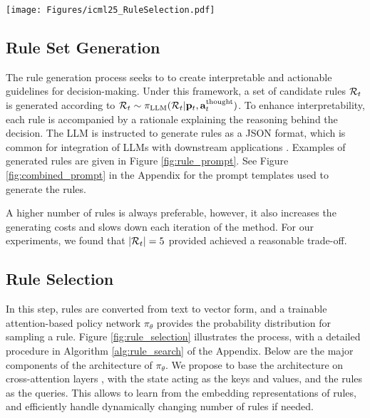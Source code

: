\begin{figure*}
    \centering
    \texttt{[image: Figures/icml25\_RuleSelection.pdf]}
    \caption{Overview of the \textsc{Rule Selection} step. The current state is encoded as a key vector, while candidate rules are encoded as Queries using a text embedding API (e.b., BERT sentence embedding). An attention-based policy network $\pi_\theta$ trained with SAC computes a probability distribution over the candidate rules, enabling the selection of the most suitable rule for decision-making and explanation.}
    \label{fig:rule_selection}
\end{figure*}

\subsection{Rule Set Generation}
\label{sec:rulegen}

The rule generation process seeks to to create interpretable and actionable guidelines for decision-making.
Under this framework, a set of candidate rules ${\mathcal{R}}_t$ is generated according to ${\mathcal{R}}_t\sim \pi_{\textrm{LLM}}({\mathcal{R}}_t|{\mathbf{p}}_t, {\mathbf{a}}^{\text{thought}}_t)$. To enhance interpretability, each rule is accompanied by a rationale explaining the reasoning behind the decision.  The LLM is instructed to generate rules as a JSON format, which is common for integration of LLMs with downstream applications \cite{together2024function}. Examples of generated rules are given in Figure \ref{fig:rule_prompt}. See Figure \ref{fig:combined_prompt} in the Appendix for the prompt templates used to generate the rules.


 A higher number of rules is always preferable, however, it also increases the generating costs and slows down each iteration of the method. For our experiments, we found that $|{\mathcal{R}}_t|=5$ provided achieved a reasonable trade-off.







\subsection{Rule Selection}\label{sec:ruleselection}

In this step, rules are converted from text to vector form, and a trainable attention-based policy network $\pi_{\theta}$ provides the probability distribution for sampling a rule. Figure \ref{fig:rule_selection} illustrates the process, with a detailed procedure in Algorithm \ref{alg:rule_search} of the Appendix. Below are the major components of the architecture of $\pi_\theta$. We propose to base the architecture on cross-attention layers \cite{bahdanau2014neural, vaswani2017attention}, with the state acting as the keys and values, and the rules as the queries. This allows to learn from the embedding representations of rules, and efficiently handle dynamically changing number of rules if needed.


